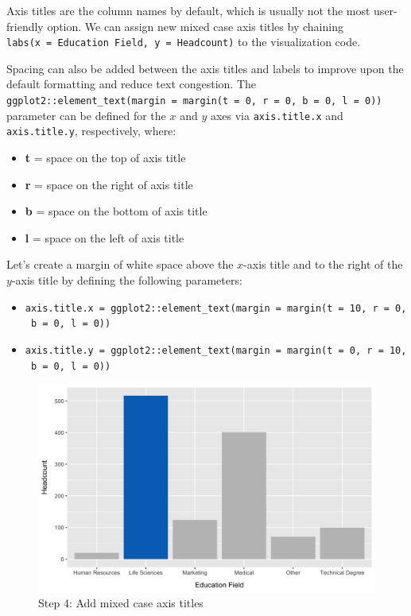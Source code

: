 \documentclass[
]{book}
\providecommand{\tightlist}{%
  \setlength{\itemsep}{0pt}\setlength{\parskip}{0pt}}
\begin{document}
Axis titles are the column names by default, which is usually not the most user-friendly option. We can assign new mixed case axis titles by chaining \texttt{labs(x\ =\ \textquotesingle{}Education\ Field\textquotesingle{},\ y\ =\ \textquotesingle{}Headcount\textquotesingle{})} to the visualization code.

Spacing can also be added between the axis titles and labels to improve upon the default formatting and reduce text congestion. The \texttt{ggplot2::element\_text(margin\ =\ margin(t\ =\ 0,\ r\ =\ 0,\ b\ =\ 0,\ l\ =\ 0))} parameter can be defined for the \(x\) and \(y\) axes via \texttt{axis.title.x} and \texttt{axis.title.y}, respectively, where:

\begin{itemize}
\tightlist
\item
  \textbf{t} = space on the top of axis title
\item
  \textbf{r} = space on the right of axis title
\item
  \textbf{b} = space on the bottom of axis title
\item
  \textbf{l} = space on the left of axis title
\end{itemize}

Let's create a margin of white space above the \(x\)-axis title and to the right of the \(y\)-axis title by defining the following parameters:

\begin{itemize}
\tightlist
\item
  \texttt{axis.title.x\ =\ ggplot2::element\_text(margin\ =\ margin(t\ =\ 10,\ r\ =\ 0,\ b\ =\ 0,\ l\ =\ 0))}
\item
  \texttt{axis.title.y\ =\ ggplot2::element\_text(margin\ =\ margin(t\ =\ 0,\ r\ =\ 10,\ b\ =\ 0,\ l\ =\ 0))}
\end{itemize}

\begin{figure}

{\centering \includegraphics[width=1\linewidth]{graphics/viz_step_4} 

}

\caption{Step 4: Add mixed case axis titles}\label{fig:barchart-4}
\end{figure}
\end{document}
